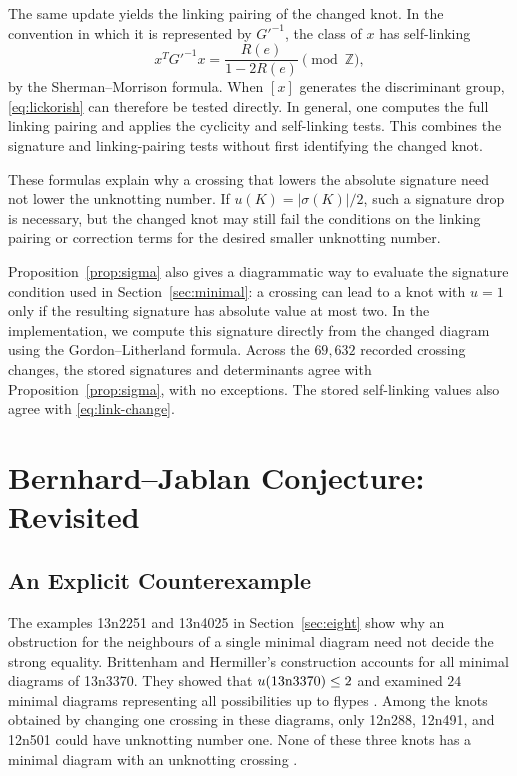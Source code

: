 \documentclass[12pt, oneside]{amsart}
\newcommand{\bbz}{{\mathbb Z}}
\newcommand{\kn}[2]{\textup{#1#2}}
\newcommand{\Reff}{R}
\begin{document}
The same update yields the linking pairing of the changed knot. In the convention in
which it is represented by $G'^{-1}$, the class of $x$ has self-linking
\begin{equation}\label{eq:link-change}
    x^TG'^{-1}x=\frac{\Reff(e)}{1-2\Reff(e)}\pmod{\bbz},
\end{equation}
by the Sherman--Morrison formula. When $[x]$ generates the discriminant group,
\eqref{eq:lickorish} can therefore be tested directly. In general, one computes the full
linking pairing and applies the cyclicity and self-linking tests. This combines the signature and linking-pairing tests
without first identifying the changed knot.

These formulas explain why a crossing that lowers the absolute signature need not lower
the unknotting number. If $u(K)=|\sigma(K)|/2$, such a signature drop is necessary, but
the changed knot may still fail the conditions on the linking pairing or correction terms for the
desired smaller unknotting number.

Proposition~\ref{prop:sigma} also gives a diagrammatic way to evaluate the
signature condition used in Section~\ref{sec:minimal}: a crossing can lead
to a knot with $u=1$ only if the resulting signature has absolute value at
most two. In the implementation, we compute this signature directly from
the changed diagram using the Gordon--Litherland formula. Across the
$69{,}632$ recorded crossing changes, the stored signatures and determinants
agree with Proposition~\ref{prop:sigma}, with no exceptions. The stored
self-linking values also agree with \eqref{eq:link-change}.

\section{Bernhard--Jablan Conjecture: Revisited}\label{sec:bj}

\subsection{An Explicit Counterexample}\label{sec:bj-counterexample}

The examples \kn{13n}{2251} and \kn{13n}{4025} in
Section~\ref{sec:eight} show why an obstruction for the neighbours of a
single minimal diagram need not decide the strong equality. Brittenham
and Hermiller's construction accounts for all minimal diagrams of
\kn{13n}{3370}. They showed that
$u(\kn{13n}{3370})\le2$ and examined $24$ minimal diagrams representing all possibilities up to flypes \cite[\S2.4]{BH1705}.
Among the knots obtained by changing one crossing in these diagrams, only
\kn{12n}{288}, \kn{12n}{491}, and \kn{12n}{501} could have unknotting number one.
None of these three knots has a minimal diagram with an unknotting crossing
\cite[Thm.~1.3 and \S2.4]{BH1705}.
\end{document}
